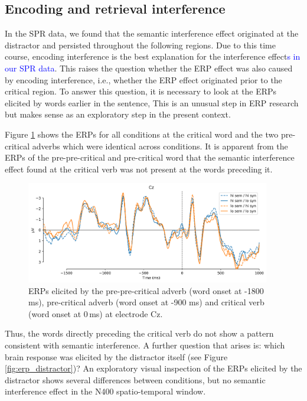\documentclass[a4paper, man, floatsintext]{apa7}
\begin{document}
{\subsection{Encoding and retrieval interference}
In the SPR data, we found that the semantic interference effect originated at the distractor and persisted throughout the following regions. Due to this time course, encoding interference \parencite{Yadavetal2022,hammerly2019grammaticality} is the best explanation for the interference effect\textcolor{blue}{s in our SPR data}. This raises the question whether the ERP effect was also caused by encoding interference, i.e., whether the ERP effect originated prior to the critical region. To answer this question, it is necessary to look at the ERPs elicited by words earlier in the sentence, This is an unusual step in ERP research but makes sense as an exploratory step in the present context. 

Figure \ref{fig:erp_precrit} shows the ERPs for all conditions at the critical word and the two pre-critical adverbs which were identical across conditions. It is apparent from the ERPs of the pre-pre-critical and pre-critical word that the semantic interference effect found at the critical verb was not present at the words preceding it. 

\begin{figure}[H]
    \caption{ERPs elicited by the pre-pre-critical adverb (word onset at -1800 ms), pre-critical adverb (word onset at -900 ms) and critical verb (word onset at 0\,ms) at electrode Cz.}
    \label{fig:erp_precrit}
    \centering
    \includegraphics[width=0.95\textwidth]{images/N_103_Cz_precrit.png}
\end{figure}

Thus, the words directly preceding the critical verb do not show a pattern consistent with semantic interference. A further question that arises is: which brain response was elicited by the distractor itself (see Figure \ref{fig:erp_distractor})? An exploratory visual inspection of the ERPs elicited by the distractor shows several differences between conditions, but no semantic interference effect in the N400 spatio-temporal window. 

}
\end{document}

